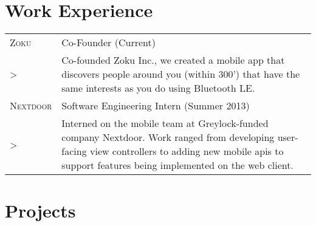 \documentclass[a4paper, oneside, final]{scrartcl} %
\newcommand{\gray}{\rowcolor[gray]{.90}} %
\begin{document}
\begin{center}


\section{Work Experience}

\begin{tabularx}{0.97\linewidth}{>{\raggedleft\scshape}p{2.0cm}X}
    \gray Zoku & Co-Founder (Current)\\
    >& Co-founded Zoku Inc., we created a mobile app that discovers people around you (within 300') that have the same interests as you do using Bluetooth LE.\\
    \gray Nextdoor & Software Engineering Intern (Summer 2013)\\
  >& Interned on the mobile team at Greylock-funded company Nextdoor.  Work ranged from developing user-facing view controllers to adding new mobile apis to support features being implemented on the web client.\\
\end{tabularx}

\section{Projects}


\end{center}
\end{document}
